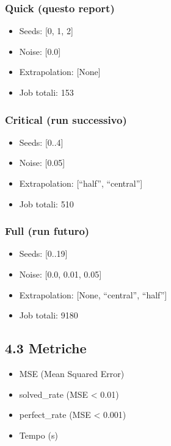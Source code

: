 \documentclass[
]{article}
\providecommand{\tightlist}{%
  \setlength{\itemsep}{0pt}\setlength{\parskip}{0pt}}
\begin{document}
\subsubsection{Quick (questo report)}\label{quick-questo-report}

\begin{itemize}
\tightlist
\item
  Seeds: {[}0, 1, 2{]}
\item
  Noise: {[}0.0{]}
\item
  Extrapolation: {[}None{]}
\item
  Job totali: 153
\end{itemize}

\subsubsection{Critical (run successivo)}\label{critical-run-successivo}

\begin{itemize}
\tightlist
\item
  Seeds: {[}0..4{]}
\item
  Noise: {[}0.05{]}
\item
  Extrapolation: {[}``half'', ``central''{]}
\item
  Job totali: 510
\end{itemize}

\subsubsection{Full (run futuro)}\label{full-run-futuro}

\begin{itemize}
\tightlist
\item
  Seeds: {[}0..19{]}
\item
  Noise: {[}0.0, 0.01, 0.05{]}
\item
  Extrapolation: {[}None, ``central'', ``half''{]}
\item
  Job totali: 9180
\end{itemize}

\subsection{4.3 Metriche}\label{metriche}

\begin{itemize}
\tightlist
\item
  MSE (Mean Squared Error)
\item
  solved\_rate (MSE \textless{} 0.01)
\item
  perfect\_rate (MSE \textless{} 0.001)
\item
  Tempo (s)
\end{itemize}
\end{document}
